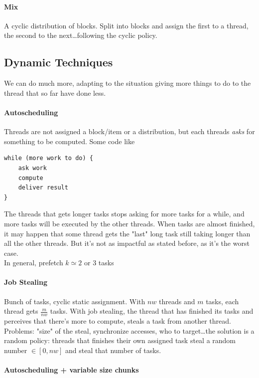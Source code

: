 \documentclass[10pt]{report}
\begin{document}
\paragraph{Mix} A cyclic distribution of blocks. Split into blocks and assign the first to a thread, the second to the next\ldots following the cyclic policy.
\subsection{Dynamic Techniques}
We can do much more, adapting to the situation giving more things to do to the thread that so far have done less.
\paragraph{Autoscheduling} Threads are not assigned a block/item or a distribution, but each threads \textit{asks} for something to be computed. Some code like \begin{lstlisting}
while (more work to do) {
	ask work
	compute
	deliver result
}
\end{lstlisting}
The threads that gets longer tasks stops asking for more tasks for a while, and more tasks will be executed by the other threads. When tasks are almost finished, it may happen that some thread gets the "last" long task still taking longer than all the other threads. But it's not as impactful as stated before, as it's the worst case.\\
In general, prefetch $k \simeq 2$ or $3$ tasks
\paragraph{Job Stealing} Bunch of tasks, cyclic static assignment. With $nw$ threads and $m$ tasks, each thread gets $\frac{m}{nw}$ tasks. With job stealing, the thread that has finished its tasks and perceives that there's more to compute, steals a task from another thread. Problems: "size" of the steal, synchronize accesses, who to target\ldots the solution is a random policy: threads that finishes their own assigned task steal a random number $\in[0, nw]$ and steal that number of tasks.
\paragraph{Autoscheduling + variable size chunks}
\end{document}
